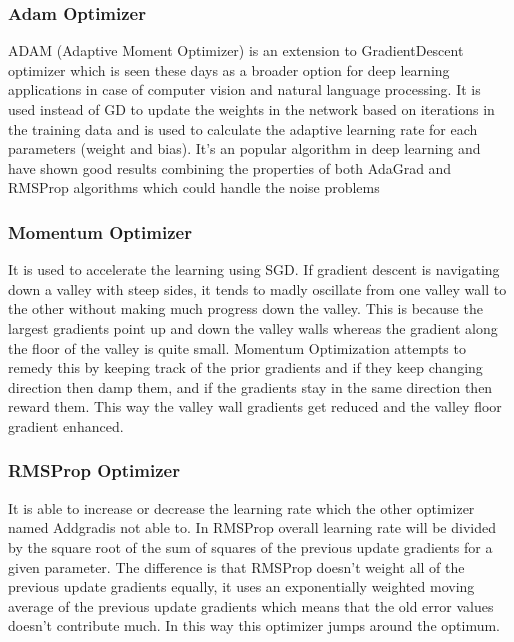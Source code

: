 \documentclass[12pt, a4paper]{report}
\begin{document}
\subsubsection{Adam Optimizer}\label{adam}
ADAM (Adaptive Moment Optimizer) is an extension to GradientDescent optimizer which is seen these days as a broader option for deep learning applications in case of computer vision and natural language processing. It is used instead of GD to update the weights in the network based on iterations in the training data and is used to calculate the adaptive learning rate for each parameters (weight and bias)\cite{OptimizerGeneral}. It’s an popular algorithm in deep learning and have shown good results combining the properties of both AdaGrad and RMSProp algorithms which could handle the noise problems\\ \par

\subsubsection{Momentum Optimizer}\label{momentum}
It is used to accelerate the learning using SGD. If gradient descent is navigating down a valley with steep sides, it tends to madly oscillate from one valley wall to the other without making much progress down the valley. This is because the largest gradients point up and down the valley walls whereas the gradient along the floor of the valley is quite small. Momentum Optimization attempts to remedy this by keeping track of the prior gradients and if they keep changing direction then damp them, and if the gradients stay in the same direction then reward them. This way the valley wall gradients get reduced and the valley floor gradient enhanced.\cite{momentum}\\ \par

\subsubsection{RMSProp Optimizer}\label{RMSProp}
It is able to increase or decrease the learning rate which the other optimizer named Addgradis not able to. In RMSProp overall learning rate will be divided by the square root of the sum of squares of the previous update gradients for a given parameter. The difference is that RMSProp doesn’t weight all of the previous update gradients equally, it uses an exponentially weighted moving average of the previous update gradients which means that the old error values doesn’t contribute much\cite{OptimizerGeneral}. In this way this optimizer jumps around the optimum.
\end{document}

